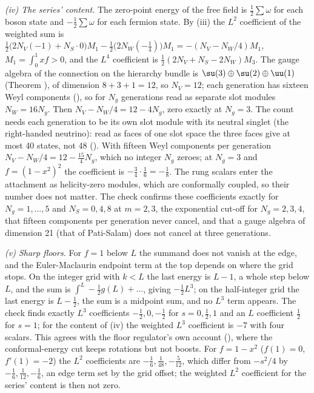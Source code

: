 \emph{(iv) The series' content.} The zero-point energy of the free field is $\tfrac12\sum\omega$ for each boson state and $-\tfrac12\sum\omega$ for each fermion state. By (iii) the $L^{2}$ coefficient of the weighted sum is $\tfrac12\bigl(2N_{V}(-1) + N_{S}\cdot 0\bigr)M_{1} - \tfrac12\bigl(2N_{W}(-\tfrac14)\bigr)M_{1} = -(N_{V} - N_{W}/4)M_{1}$, $M_{1} = \int_{0}^{1}xf > 0$, and the $L^{4}$ coefficient is $\tfrac12(2N_{V} + N_{S} - 2N_{W})M_{3}$. The gauge algebra of the connection on the hierarchy bundle is $\su(3) \oplus \su(2) \oplus \uu(1)$ (Theorem ), of dimension $8 + 3 + 1 = 12$, so $N_{V} = 12$; each generation has sixteen Weyl components (), so for $N_{g}$ generations read as separate slot modules $N_{W} = 16N_{g}$. Then $N_{V} - N_{W}/4 = 12 - 4N_{g}$, zero exactly at $N_{g} = 3$. The count needs each generation to be its own slot module with its neutral singlet (the right-handed neutrino): read as faces of one slot space the three faces give at most 40 states, not 48 (). With fifteen Weyl components per generation $N_{V} - N_{W}/4 = 12 - \tfrac{15}{4}N_{g}$, which no integer $N_{g}$ zeroes; at $N_{g} = 3$ and $f = (1 - x^{2})^{2}$ the coefficient is $-\tfrac34 \cdot \tfrac16 = -\tfrac18$. The rung scalars enter the attachment as helicity-zero modules, which are conformally coupled, so their number does not matter. The check confirms these coefficients exactly for $N_{g} = 1, \dots, 5$ and $N_{S} = 0, 4, 8$ at $m = 2, 3$, the exponential cut-off for $N_{g} = 2, 3, 4$, that fifteen components per generation never cancel, and that a gauge algebra of dimension 21 (that of Pati-Salam) does not cancel at three generations.

\emph{(v) Sharp floors.} For $f = 1$ below $L$ the summand does not vanish at the edge, and the Euler-Maclaurin endpoint term at the top depends on where the grid stops. On the integer grid with $k < L$ the last energy is $L - 1$, a whole step below $L$, and the sum is $\int^{L} - \tfrac12 g(L) + \dots$, giving $-\tfrac12L^{3}$; on the half-integer grid the last energy is $L - \tfrac12$, the sum is a midpoint sum, and no $L^{3}$ term appears. The check finds exactly $L^{3}$ coefficients $-\tfrac12, 0, -\tfrac12$ for $s = 0, \tfrac12, 1$ and an $L$ coefficient $\tfrac12$ for $s = 1$; for the content of (iv) the weighted $L^{3}$ coefficient is $-7$ with four scalars. This agrees with the floor regulator's own account (), where the conformal-energy cut keeps rotations but not boosts. For $f = 1 - x^{2}$ ($f(1) = 0$, $f'(1) = -2$) the $L^{2}$ coefficients are $-\tfrac16, \tfrac1{48}, -\tfrac5{12}$, which differ from $-s^{2}/4$ by $-\tfrac16, \tfrac1{12}, -\tfrac16$, an edge term set by the grid offset; the weighted $L^{2}$ coefficient for the series' content is then not zero.

